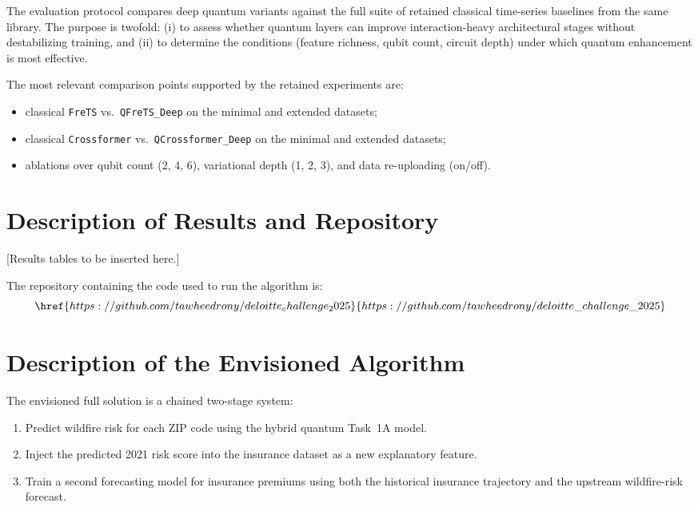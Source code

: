 \documentclass[11pt]{article}
\begin{document}
The evaluation protocol compares deep quantum variants against the full suite of retained classical time-series baselines from the same library. The purpose is twofold: (i) to assess whether quantum layers can improve interaction-heavy architectural stages without destabilizing training, and (ii) to determine the conditions (feature richness, qubit count, circuit depth) under which quantum enhancement is most effective.

The most relevant comparison points supported by the retained experiments are:
\begin{itemize}
  \item classical \texttt{FreTS} vs.\ \texttt{QFreTS\_Deep} on the minimal and extended datasets;
  \item classical \texttt{Crossformer} vs.\ \texttt{QCrossformer\_Deep} on the minimal and extended datasets;
  \item ablations over qubit count (2, 4, 6), variational depth (1, 2, 3), and data re-uploading (on/off).
\end{itemize}


\section{Description of Results and Repository}

[Results tables to be inserted here.]

The repository containing the code used to run the algorithm is:
\[
\href{https://github.com/tawheedrony/deloitte_challenge_2025}{https://github.com/tawheedrony/deloitte\_challenge\_2025}
\]


\section{Description of the Envisioned Algorithm}

The envisioned full solution is a chained two-stage system:
\begin{enumerate}
  \item Predict wildfire risk for each ZIP code using the hybrid quantum Task~1A model.
  \item Inject the predicted 2021 risk score into the insurance dataset as a new explanatory feature.
  \item Train a second forecasting model for insurance premiums using both the historical insurance trajectory and the upstream wildfire-risk forecast.
\end{enumerate}
\end{document}
